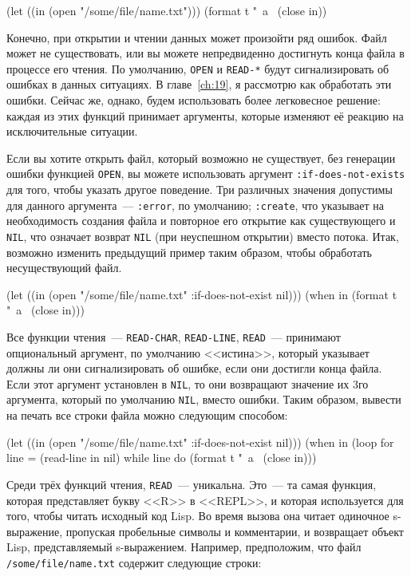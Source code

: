 \begin{myverb}
(let ((in (open "/some/file/name.txt")))
  (format t "~a~%
  (close in))
\end{myverb}

Конечно, при открытии и чтении данных может произойти ряд ошибок. Файл может не
существовать, или вы можете непредвиденно достигнуть конца файла в процессе его чтения. По
умолчанию, \lstinline{OPEN} и \lstinline{READ-*} будут сигнализировать об ошибках в данных
ситуациях. В главе~\ref{ch:19}, я рассмотрю как обработать эти ошибки. Сейчас же, однако, будем
использовать более легковесное решение: каждая из этих функций принимает аргументы,
которые изменяют её реакцию на исключительные ситуации.

Если вы хотите открыть файл, который возможно не существует, без генерации ошибки
функцией \lstinline{OPEN}, вы можете использовать аргумент \lstinline{:if-does-not-exists} для того,
чтобы указать другое поведение. Три различных значения допустимы для данного аргумента~---
\lstinline{:error}, по умолчанию; \lstinline{:create}, что указывает на необходимость создания файла
и повторное его открытие как существующего и \lstinline{NIL}, что означает возврат \lstinline{NIL}
(при неуспешном открытии) вместо потока. Итак, возможно изменить предыдущий пример таким
образом, чтобы обработать несуществующий файл.

\begin{myverb}
(let ((in (open "/some/file/name.txt" :if-does-not-exist nil)))
  (when in
    (format t "~a~%
    (close in)))
\end{myverb}

Все функции чтения~--- \lstinline{READ-CHAR}, \lstinline{READ-LINE}, \lstinline{READ}~--- принимают
опциональный аргумент, по умолчанию <<истина>>, который указывает должны ли они
сигнализировать об ошибке, если они достигли конца файла. Если этот аргумент установлен в
\lstinline{NIL}, то они возвращают значение их 3го аргумента, который по умолчанию \lstinline{NIL},
вместо ошибки. Таким образом, вывести на печать все строки файла можно следующим способом:

\begin{myverb}
(let ((in (open "/some/file/name.txt" :if-does-not-exist nil)))
  (when in
    (loop for line = (read-line in nil)
         while line do (format t "~a~%
    (close in)))
\end{myverb}

Среди трёх функций чтения, \lstinline{READ}~--- уникальна. Это~--- та самая функция, которая
представляет букву <<R>> в <<REPL>>, и которая используется для того, чтобы читать исходный
код Lisp. Во время вызова она читает одиночное s-выражение, пропуская пробельные символы и
комментарии, и возвращает объект Lisp, представляемый s-выражением. Например, предположим,
что файл \lstinline{/some/file/name.txt} содержит следующие строки:

